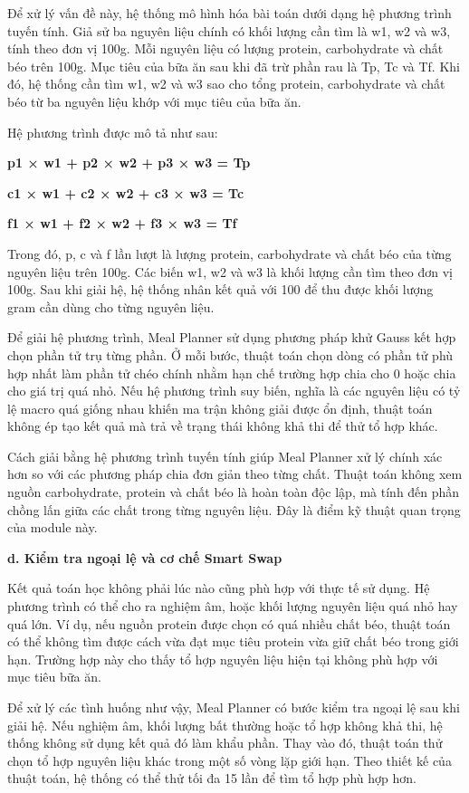 \documentclass[12pt, a4paper]{report}
\begin{document}
Để xử lý vấn đề này, hệ thống mô hình hóa bài toán dưới dạng hệ phương trình tuyến tính. Giả sử ba nguyên liệu chính có khối lượng cần tìm là w1, w2 và w3, tính theo đơn vị 100g. Mỗi nguyên liệu có lượng protein, carbohydrate và chất béo trên 100g. Mục tiêu của bữa ăn sau khi đã trừ phần rau là Tp, Tc và Tf. Khi đó, hệ thống cần tìm w1, w2 và w3 sao cho tổng protein, carbohydrate và chất béo từ ba nguyên liệu khớp với mục tiêu của bữa ăn.

Hệ phương trình được mô tả như sau:

\textbf{p1 × w1 + p2 × w2 + p3 × w3 = Tp}

\textbf{c1 × w1 + c2 × w2 + c3 × w3 = Tc}

\textbf{f1 × w1 + f2 × w2 + f3 × w3 = Tf}

Trong đó, p, c và f lần lượt là lượng protein, carbohydrate và chất béo của từng nguyên liệu trên 100g. Các biến w1, w2 và w3 là khối lượng cần tìm theo đơn vị 100g. Sau khi giải hệ, hệ thống nhân kết quả với 100 để thu được khối lượng gram cần dùng cho từng nguyên liệu.

Để giải hệ phương trình, Meal Planner sử dụng phương pháp khử Gauss kết hợp chọn phần tử trụ từng phần. Ở mỗi bước, thuật toán chọn dòng có phần tử phù hợp nhất làm phần tử chéo chính nhằm hạn chế trường hợp chia cho 0 hoặc chia cho giá trị quá nhỏ. Nếu hệ phương trình suy biến, nghĩa là các nguyên liệu có tỷ lệ macro quá giống nhau khiến ma trận không giải được ổn định, thuật toán không ép tạo kết quả mà trả về trạng thái không khả thi để thử tổ hợp khác.

Cách giải bằng hệ phương trình tuyến tính giúp Meal Planner xử lý chính xác hơn so với các phương pháp chia đơn giản theo từng chất. Thuật toán không xem nguồn carbohydrate, protein và chất béo là hoàn toàn độc lập, mà tính đến phần chồng lấn giữa các chất trong từng nguyên liệu. Đây là điểm kỹ thuật quan trọng của module này.

\textbf{d. Kiểm tra ngoại lệ và cơ chế Smart Swap}

Kết quả toán học không phải lúc nào cũng phù hợp với thực tế sử dụng. Hệ phương trình có thể cho ra nghiệm âm, hoặc khối lượng nguyên liệu quá nhỏ hay quá lớn. Ví dụ, nếu nguồn protein được chọn có quá nhiều chất béo, thuật toán có thể không tìm được cách vừa đạt mục tiêu protein vừa giữ chất béo trong giới hạn. Trường hợp này cho thấy tổ hợp nguyên liệu hiện tại không phù hợp với mục tiêu bữa ăn.

Để xử lý các tình huống như vậy, Meal Planner có bước kiểm tra ngoại lệ sau khi giải hệ. Nếu nghiệm âm, khối lượng bất thường hoặc tổ hợp không khả thi, hệ thống không sử dụng kết quả đó làm khẩu phần. Thay vào đó, thuật toán thử chọn tổ hợp nguyên liệu khác trong một số vòng lặp giới hạn. Theo thiết kế của thuật toán, hệ thống có thể thử tối đa 15 lần để tìm tổ hợp phù hợp hơn.
\end{document}
